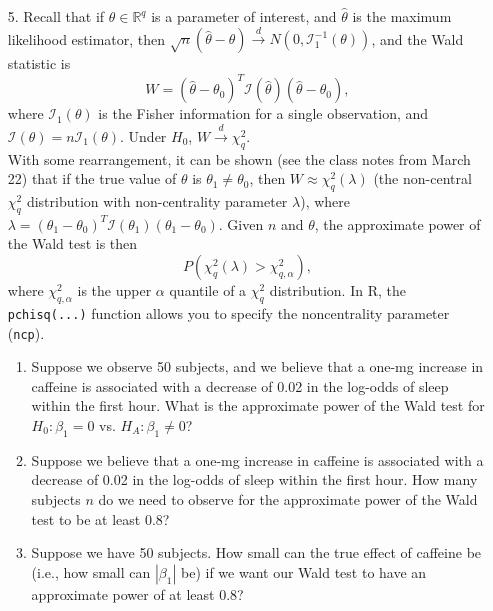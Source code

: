 \documentclass[11pt]{article}
\begin{document}
\begin{enumerate}
\item[5.] Recall that if $\theta \in \mathbb{R}^q$ is a parameter of interest, and $\widehat{\theta}$ is the maximum likelihood estimator, then $\sqrt{n}(\widehat{\theta} - \theta) \overset{d}{\to} N(0, \mathcal{I}_1^{-1}(\theta))$, and the Wald statistic is
$$W = (\widehat{\theta} - \theta_0)^T \mathcal{I}(\widehat{\theta}) (\widehat{\theta} - \theta_0),$$
where $\mathcal{I}_1(\theta)$ is the Fisher information for a single observation, and $\mathcal{I}(\theta) = n\mathcal{I}_1(\theta)$. Under $H_0$, $W \overset{d}{\to} \chi^2_q$.\\

With some rearrangement, it can be shown (see the class notes from March 22) that if the true value of $\theta$ is $\theta_1 \neq \theta_0$, then $W \approx \chi^2_q(\lambda)$ (the non-central $\chi^2_q$ distribution with non-centrality parameter $\lambda$), where 
$\lambda = (\theta_1 - \theta_0)^T \mathcal{I}(\theta_1)(\theta_1 - \theta_0)$. Given $n$ and $\theta$, the approximate power of the Wald test is then
$$P(\chi^2_q(\lambda) > \chi^2_{q, \alpha}),$$
where $\chi^2_{q, \alpha}$ is the upper $\alpha$ quantile of a $\chi^2_q$ distribution. In R, the \verb;pchisq(...); function allows you to specify the noncentrality parameter (\verb;ncp;).

\begin{enumerate}
\item Suppose we observe 50 subjects, and we believe that a one-mg increase in caffeine is associated with a decrease of 0.02 in the log-odds of sleep within the first hour. What is the approximate power of the Wald test for $H_0: \beta_1 = 0$ vs. $H_A: \beta_1 \neq 0$?

\item Suppose we believe that a one-mg increase in caffeine is associated with a decrease of 0.02 in the log-odds of sleep within the first hour. How many subjects $n$ do we need to observe for the approximate power of the Wald test to be at least 0.8?

\item Suppose we have 50 subjects. How small can the true effect of caffeine be (i.e., how small can $|\beta_1|$ be) if we want our Wald test to have an approximate power of at least 0.8?
\end{enumerate}
\end{enumerate}
\end{document}

